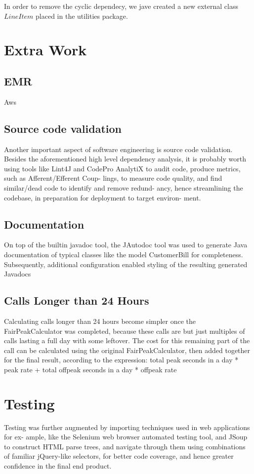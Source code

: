 \documentclass[11pt,twocolumn]{article} %
\begin{document}
In order to remove the cyclic dependecy, we jave created a new external class $LineItem$ placed in the 
utilities package.


\section{Extra Work}
\subsection{EMR}
Aws

\subsection{Source code validation}
Another important aspect of software engineering is source code validation. Besides the
aforementioned high level dependency analysis, it is probably worth using tools like Lint4J
and CodePro AnalytiX to audit code, produce metrics, such as Afferent/Efferent Coup-
lings, to measure code quality, and find similar/dead code to identify and remove redund-
ancy, hence streamlining the codebase, in preparation for deployment to target environ-
ment.

\subsection{Documentation}
On top of the builtin javadoc tool, the JAutodoc tool was used to generate Java documentation of typical classes like the model CustomerBill for completeness.
Subsequently, additional configuration enabled styling of the resulting generated Javadocs

\subsection{Calls Longer than 24 Hours}
Calculating calls longer than 24 hours become simpler once the FairPeakCalculator was
completed, because these calls are but just multiples of calls lasting a full day with some
leftover. The cost for this remaining part of the call can be calculated using the original
FairPeakCalculator, then added together for the final result, according to the expression:
total peak seconds in a day * peak rate + total offpeak seconds in a day * offpeak rate

\section{Testing}
Testing was further augmented by importing techniques used in web applications for ex-
ample, like the Selenium web browser automated testing tool, and JSoup to construct
HTML parse trees, and navigate through them using combinations of familiar jQuery-like
selectors, for better code coverage, and hence greater confidence in the final end product.
\end{document}
